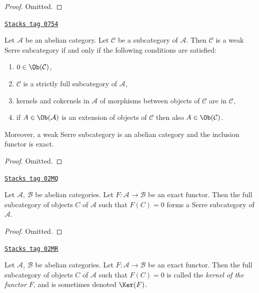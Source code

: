 \begin{proof}
Omitted.
\end{proof}

\begin{lemma}
\label{homology-lemma-characterize-weak-serre-subcategory}
\href{https://stacks.math.columbia.edu/tag/0754}{\texttt{Stacks tag 0754}}

Let $\mathcal{A}$ be an abelian category.
Let $\mathcal{C}$ be a subcategory of $\mathcal{A}$.
Then $\mathcal{C}$ is a weak Serre subcategory if and only if
the following conditions are satisfied:
\begin{enumerate}
\item $0 \in \Ob(\mathcal{C})$,
\item $\mathcal{C}$ is a strictly full subcategory of $\mathcal{A}$,
\item kernels and cokernels in $\mathcal{A}$ of morphisms
between objects of $\mathcal{C}$ are in $\mathcal{C}$,
\item if $A \in \Ob(\mathcal{A})$ is an extension of objects of $\mathcal{C}$
then also $A \in \Ob(\mathcal{C})$.
\end{enumerate}
Moreover, a weak Serre subcategory is an abelian category and
the inclusion functor is exact.
\end{lemma}

\begin{proof}
Omitted.
\end{proof}

\begin{lemma}
\label{homology-lemma-kernel-exact-functor}
\href{https://stacks.math.columbia.edu/tag/02MQ}{\texttt{Stacks tag 02MQ}}

Let $\mathcal{A}$, $\mathcal{B}$ be abelian categories.
Let $F : \mathcal{A} \to \mathcal{B}$ be an exact functor.
Then the full subcategory of objects $C$ of $\mathcal{A}$
such that $F(C) = 0$ forms a Serre subcategory of $\mathcal{A}$.
\end{lemma}

\begin{proof}
Omitted.
\end{proof}

\begin{definition}
\label{homology-definition-kernel-category}
\href{https://stacks.math.columbia.edu/tag/02MR}{\texttt{Stacks tag 02MR}}

Let $\mathcal{A}$, $\mathcal{B}$ be abelian categories.
Let $F : \mathcal{A} \to \mathcal{B}$ be an exact functor.
Then the full subcategory of objects $C$ of $\mathcal{A}$
such that $F(C) = 0$ is called the {\it kernel of the functor $F$},
and is sometimes denoted $\Ker(F)$.
\end{definition}

